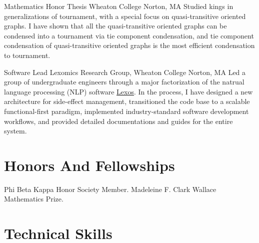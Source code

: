 \documentclass[11pt,roman]{moderncv}        %
\begin{document}
{Mathematics Honor Thesis}
{Wheaton College} {Norton, MA}{}
{Studied kings in generalizations of tournament,
with a special focus on quasi-transitive oriented graphs.
I have shown that all the quasi-transitive oriented graphs
can be condensed into a tournament via tie component condensation, 
and tie component condensation of quasi-transitive 
oriented graphs is the most efficient condensation to tournament.
}

{Software Lead}
{Lexomics Research Group, Wheaton College}
{Norton, MA}{}
{
  Led a group of undergraduate engineers through a major factorization of 
  the natrual language processing (NLP) software 
  \href{https://github.com/WheatonCS/Lexos}{Lexos}.
  In the process, 
  I have designed a new architecture for side-effect management,
  transitioned the code base to a scalable functional-first paradigm,
  implemented industry-standard software development workflows,
  and provided detailed documentations and guides for the entire system.
}


\section{Honors And Fellowships}
 {Phi Beta Kappa Honor Society Member.}
 {Madeleine F. Clark Wallace Mathematics Prize.}


\section{Technical Skills}

\iftechnical
{}
\else
{}
\fi
\end{document}
